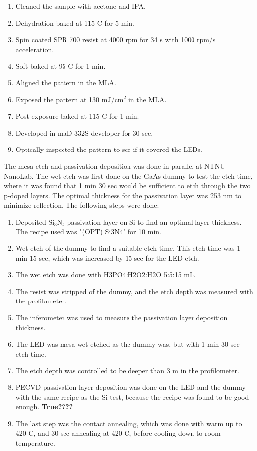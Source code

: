 \begin{enumerate}
    \item Cleaned the sample with acetone and IPA.
    \item Dehydration baked at 115 \textdegree C for 5 min.
    \item Spin coated SPR 700 resist at 4000 rpm for 34 s with 1000 rpm/s acceleration.
    \item Soft baked at 95 \textdegree C for 1 min.
    \item Aligned the pattern in the MLA.
    \item Exposed the pattern at 130 mJ/cm$^2$ in the MLA.
    \item Post exposure baked at 115 \textdegree C for 1 min.
    \item Developed in maD-332S developer for 30 sec.
    \item Optically inspected the pattern to see if it covered the LEDs.
\end{enumerate}

The mesa etch and passivation deposition was done in parallel at NTNU NanoLab.
The wet etch was first done on the GaAs dummy to test the etch time, where it was found that 1 min 30 sec would be sufficient to etch through the two p-doped layers.
The optimal thickness for the passivation layer was 253 nm to minimize reflection.
The following steps were done:

\begin{enumerate}
    \item Deposited Si$_3$N$_4$ passivation layer on Si to find an optimal layer thickness. The recipe used was "(OPT) Si3N4" for 10 min.
    \item Wet etch of the dummy to find a suitable etch time. This etch time was 1 min 15 sec, which was increased by 15 sec for the LED etch.
    \item The wet etch was done with H3PO4:H2O2:H2O 5:5:15 mL.
    \item The resist was stripped of the dummy, and the etch depth was measured with the profilometer.
    \item The inferometer was used to measure the passivation layer deposition thickness.
    \item The LED was mesa wet etched as the dummy was, but with 1 min 30 sec etch time.
    \item The etch depth was controlled to be deeper than 3 \textmu m in the profilometer.
    \item PECVD passivation layer deposition was done on the LED and the dummy with the same recipe as the Si test, because the recipe was found to be good enough. \textbf{True????}
    \item The last step was the contact annealing, which was done with warm up to 420 \textdegree C, and 30 sec annealing at 420 \textdegree C, before cooling down to room temperature.
\end{enumerate}



